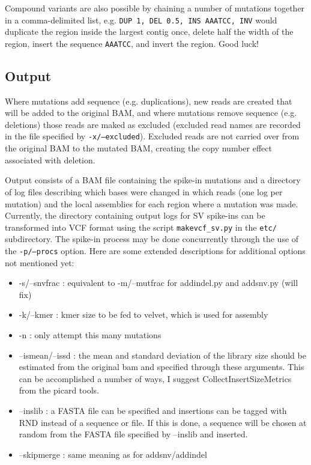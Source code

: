 \documentclass[letterpaper,11pt]{article}
\begin{document}
    Compound variants are also possible by chaining a number of mutations together in a comma-delimited list, e.g. \texttt{DUP 1, DEL 0.5, INS AAATCC, INV} would duplicate the region inside the largest contig once, delete half the width of the region, insert the sequence \texttt{AAATCC}, and invert the region. Good luck!

\subsection{Output}
    Where mutations add sequence (e.g. duplications), new reads are created that will be added to the original BAM, and where mutations remove sequence (e.g. deletions) those reads are maked as excluded (excluded read names are recorded in the file specified by \texttt{-x/--excluded}). Excluded reads are not carried over from the original BAM to the mutated BAM, creating the copy number effect associated with deletion.
    
     Output consists of a BAM file containing the spike-in mutations and a directory of log files describing which bases were changed in which reads (one log per mutation) and the local assemblies for each region where a mutation was made. Currently, the directory containing output logs for SV spike-ins can be transformed into VCF format using the script \texttt {makevcf\_sv.py} in the \texttt {etc/} subdirectory. The spike-in process may be done concurrently through the use of the \texttt {-p/--procs} option. Here are some extended descriptions for additional options not mentioned yet:
     
\begin{itemize}
\item -s/--snvfrac : equivalent to -m/--mutfrac for addindel.py and addsnv.py (will fix)
\item -k/--kmer : kmer size to be fed to velvet, which is used for assembly
\item -n : only attempt this many mutations
\item --ismean/--issd : the mean and standard deviation of the library size should be estimated from the original bam and specified through these arguments. This can be accomplished a number of ways, I suggest CollectInsertSizeMetrics from the picard tools.
\item --inslib : a FASTA file can be specified and insertions can be tagged with RND instead of a sequence or file. If this is done, a sequence will be chosen at random from the FASTA file specified by --inslib and inserted.
\item --skipmerge : same meaning as for addsnv/addindel
\end{itemize}
\end{document}
